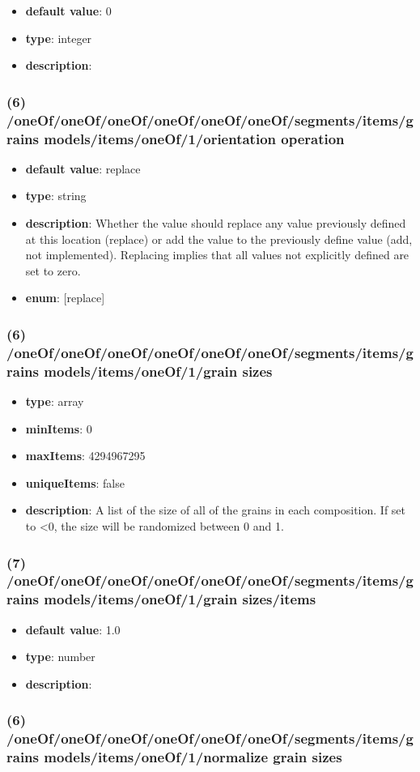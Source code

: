\begin{itemize}[leftmargin=7em]\item {\bf default value}: 0
\item {\bf type}: integer
\item {\bf description}: 
\end{itemize}\subsubsection{(6) /oneOf/oneOf/oneOf/oneOf/oneOf/oneOf/segments/items/grains models/items/oneOf/1/orientation operation}
\begin{itemize}[leftmargin=6em]\item {\bf default value}: replace
\item {\bf type}: string
\item {\bf description}: Whether the value should replace any value previously defined at this location (replace) or add the value to the previously define value (add, not implemented). Replacing implies that all values not explicitly defined are set to zero.
\item {\bf enum}: [replace]\end{itemize}\subsubsection{(6) /oneOf/oneOf/oneOf/oneOf/oneOf/oneOf/segments/items/grains models/items/oneOf/1/grain sizes}
\begin{itemize}[leftmargin=6em]\item {\bf type}: array
\item {\bf minItems}: 0
\item {\bf maxItems}: 4294967295
\item {\bf uniqueItems}: false
\item {\bf description}: A list of the size of all of the grains in each composition. If set to <0, the size will be randomized between 0 and 1.
\end{itemize}\subsubsection{(7) /oneOf/oneOf/oneOf/oneOf/oneOf/oneOf/segments/items/grains models/items/oneOf/1/grain sizes/items}
\begin{itemize}[leftmargin=7em]\item {\bf default value}: 1.0
\item {\bf type}: number
\item {\bf description}: 
\end{itemize}\subsubsection{(6) /oneOf/oneOf/oneOf/oneOf/oneOf/oneOf/segments/items/grains models/items/oneOf/1/normalize grain sizes}
